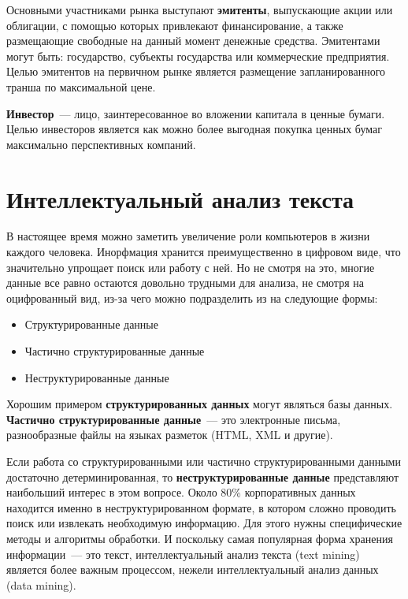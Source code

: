 \documentclass[14pt]{matmex-diploma-custom}
\begin{document}
Основными участниками рынка выступают \textbf{эмитенты}, выпускающие акции или облигации, с помощью которых привлекают финансирование, а также размещающие свободные на данный момент денежные средства. Эмитентами могут быть: государство, субъекты государства или коммерческие предприятия. Целью эмитентов на первичном рынке является размещение запланированного транша по максимальной цене.

\textbf{Инвестор}~--- лицо, заинтересованное во вложении капитала в ценные бумаги. Целью инвесторов является как можно более выгодная покупка ценных бумаг максимально перспективных компаний.

\clearpage\section{Интеллектуальный анализ текста}

\label{sec:analysis}

В настоящее время можно заметить увеличение роли компьютеров в жизни каждого человека. Инорфмация хранится преимущественно в цифровом виде, что значительно упрощает поиск или работу с ней. Но не смотря на это, многие данные все равно остаются довольно трудными для анализа, не смотря на оцифрованный вид, из-за чего можно подразделить из на следующие формы:

\begin{itemize}
\item Структурированные данные
\item Частично структурированные данные
\item Неструктурированные данные
\end{itemize}

Хорошим примером \textbf{структурированных данных} могут являться базы данных. \textbf{Частично структурированные данные}~--- это электронные письма, разнообразные файлы на языках разметок (HTML, XML и другие).

Если работа со структурированными или частично структурированными данными достаточно детерминированная, то \textbf{неструктурированные данные} представляют наибольший интерес в этом вопросе. Около 80\% корпоративных данных находится именно в неструктурированном формате, в котором сложно проводить поиск или извлекать необходимую информацию. Для этого нужны специфические методы и алгоритмы обработки. И поскольку самая популярная форма хранения информации~--- это текст, интеллектуальный анализ текста (text mining) является более важным процессом, нежели интеллектуальный анализ данных (data mining).
\end{document}
